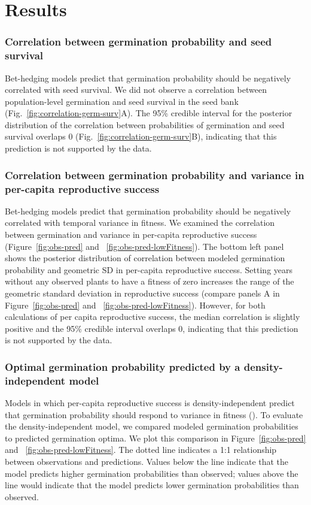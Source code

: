 \documentclass[12pt, oneside, titlepage]{article}   	%
\begin{document}
\section*{Results}

\subsubsection*{Correlation between germination probability and seed survival}

Bet-hedging models predict that germination probability should be negatively correlated with seed survival. We did not observe a correlation between population-level germination and seed survival in the seed bank (Fig.~\ref{fig:correlation-germ-surv}A). The 95\% credible interval for the posterior distribution of the correlation between probabilities of germination and seed survival overlaps 0 (Fig.~\ref{fig:correlation-germ-surv}B), indicating that this prediction is not supported by the data. 

\subsubsection*{Correlation between germination probability and variance in per-capita reproductive success}

Bet-hedging models predict that germination probability should be negatively correlated with temporal variance in fitness. We examined the correlation between germination and variance in per-capita reproductive success (Figure~\ref{fig:obs-pred} and ~\ref{fig:obs-pred-lowFitness}). The bottom left panel shows the posterior distribution of correlation between modeled germination probability and geometric SD in per-capita reproductive success. Setting years without any observed plants to have a fitness of zero increases the range of the geometric standard deviation in reproductive success (compare panels A in Figure~\ref{fig:obs-pred} and ~\ref{fig:obs-pred-lowFitness}). However, for both calculations of per capita reproductive success, the median correlation is slightly positive and the 95\% credible interval overlaps 0, indicating that this prediction is not supported by the data. 

\subsubsection*{Optimal germination probability predicted by a density-independent model}

Models in which per-capita reproductive success is density-independent predict that germination probability should respond to variance in fitness (\cite{cohen1966}). To evaluate the density-independent model, we compared modeled germination probabilities to predicted germination optima. We plot this comparison in Figure~\ref{fig:obs-pred} and ~\ref{fig:obs-pred-lowFitness}. The dotted line indicates a 1:1 relationship between observations and predictions. Values below the line indicate that the model predicts higher germination probabilities than observed; values above the line would indicate that the model predicts lower germination probabilities than observed.
\end{document}

